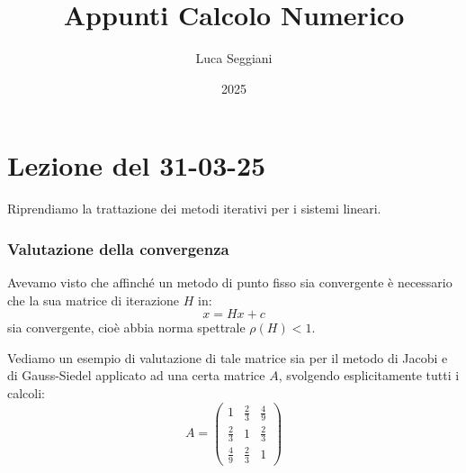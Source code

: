 \documentclass[a4paper,11pt]{article}
\title{Appunti Calcolo Numerico}
\author{Luca Seggiani}
\date{2025}
\begin{document}
\section{Lezione del 31-03-25}

\thispagestyle{empty}
\pagestyle{fancy}

Riprendiamo la trattazione dei metodi iterativi per i sistemi lineari.

\subsubsection{Valutazione della convergenza}
Avevamo visto che affinché un metodo di punto fisso sia convergente è necessario che la sua matrice di iterazione $H$ in:
$$
x = H x + c
$$
sia convergente, cioè abbia norma spettrale $\rho(H) < 1$.

Vediamo un esempio di valutazione di tale matrice sia per il metodo di Jacobi e di Gauss-Siedel applicato ad una certa matrice $A$, svolgendo esplicitamente tutti i calcoli:
$$
A = \begin{pmatrix}
	1 & \frac{2}{3} & \frac{4}{9} \\
	\frac{2}{3} & 1 & \frac{2}{3} \\ 
	\frac{4}{9} & \frac{2}{3} & 1
\end{pmatrix}
$$
\end{document}
